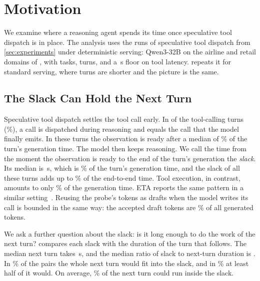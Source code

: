 \section{Motivation}
\label{sec:motivation}

We examine where a reasoning agent spends its time once speculative tool dispatch is in place.
The analysis uses the runs of speculative tool dispatch from \cref{sec:experiments} under deterministic serving: Qwen3-32B on the airline and retail domains of \taubench, with \MotTasks{} tasks, \MotTurns{} turns, and a \ToolLowFloor\,s floor on tool latency.
 repeats it for standard serving, where turns are shorter and the picture is the same.

\subsection{The Slack Can Hold the Next Turn}
\label{sec:motivation:slack}

Speculative tool dispatch settles the tool call early.
In \MotAnchorTurns{} of the \MotToolTurns{} tool-calling turns (\MotAnchorPct\%), a call is dispatched during reasoning and equals the call that the model finally emits.
In these turns the observation is ready after a median of \MotReadyPosPct\% of the turn's generation time.
The model then keeps reasoning.
We call the time from the moment the observation is ready to the end of the turn's generation the \emph{slack}.
Its median is \MotSlackMedian\,s, which is \MotSlackSharePct\% of the turn's generation time, and the slack of all these turns adds up to \MotSlackWallPct\% of the end-to-end time.
Tool execution, in contrast, amounts to only \MotToolGenPct\% of the generation time.
ETA reports the same pattern in a similar setting~\citep{anon2026eta}.
Reusing the probe's tokens as drafts when the model writes its call is bounded in the same way: the accepted draft tokens are \MotDraftTokenPct\% of all generated tokens.

We ask a further question about the slack: is it long enough to do the work of the next turn?
 compares each slack with the duration of the turn that follows.
The median next turn takes \MotNextMedian\,s, and the median ratio of slack to next-turn duration is \MotSlackOverNext.
In \MotNextFitsPct\% of the \MotPairs{} pairs the whole next turn would fit into the slack, and in \MotNextHalfPct\% at least half of it would.
On average, \MotNextCoveredPct\% of the next turn could run inside the slack.

